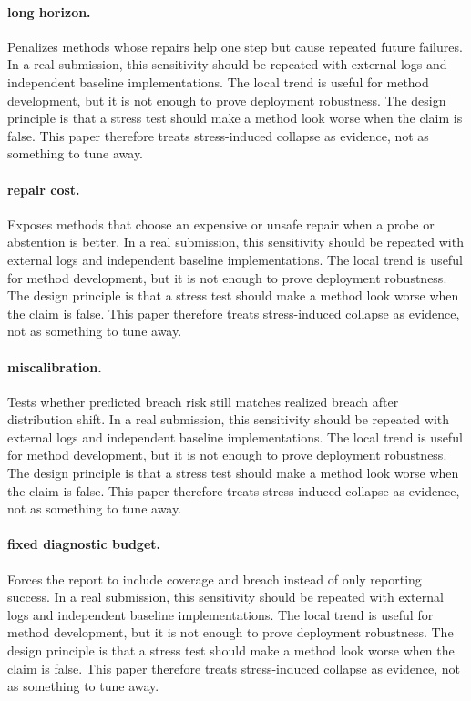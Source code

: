 \documentclass{article}
\begin{document}
\paragraph{long horizon.} Penalizes methods whose repairs help one step but cause repeated future failures. In a real submission, this sensitivity should be repeated with external logs and independent baseline implementations. The local trend is useful for method development, but it is not enough to prove deployment robustness.
The design principle is that a stress test should make a method look worse when the claim is false. This paper therefore treats stress-induced collapse as evidence, not as something to tune away.
\paragraph{repair cost.} Exposes methods that choose an expensive or unsafe repair when a probe or abstention is better. In a real submission, this sensitivity should be repeated with external logs and independent baseline implementations. The local trend is useful for method development, but it is not enough to prove deployment robustness.
The design principle is that a stress test should make a method look worse when the claim is false. This paper therefore treats stress-induced collapse as evidence, not as something to tune away.
\paragraph{miscalibration.} Tests whether predicted breach risk still matches realized breach after distribution shift. In a real submission, this sensitivity should be repeated with external logs and independent baseline implementations. The local trend is useful for method development, but it is not enough to prove deployment robustness.
The design principle is that a stress test should make a method look worse when the claim is false. This paper therefore treats stress-induced collapse as evidence, not as something to tune away.
\paragraph{fixed diagnostic budget.} Forces the report to include coverage and breach instead of only reporting success. In a real submission, this sensitivity should be repeated with external logs and independent baseline implementations. The local trend is useful for method development, but it is not enough to prove deployment robustness.
The design principle is that a stress test should make a method look worse when the claim is false. This paper therefore treats stress-induced collapse as evidence, not as something to tune away.
\end{document}
